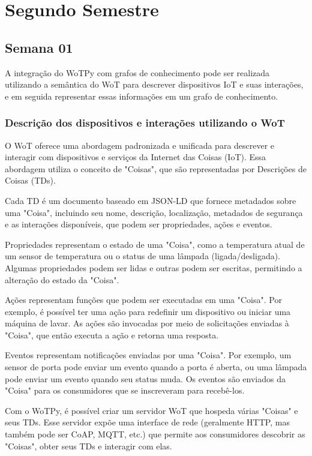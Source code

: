 \chapter{Segundo Semestre}


\section{Semana 01}

A integração do WoTPy com grafos de conhecimento pode ser realizada utilizando a semântica do WoT para descrever dispositivos IoT e suas interações, e em seguida representar essas informações em um grafo de conhecimento.

\subsection{Descrição dos dispositivos e interações utilizando o WoT}

O WoT oferece uma abordagem padronizada e unificada para descrever e interagir com dispositivos e serviços da Internet das Coisas (IoT). Essa abordagem utiliza o conceito de "Coisas", que são representadas por Descrições de Coisas (TDs).

Cada TD é um documento baseado em JSON-LD que fornece metadados sobre uma "Coisa", incluindo seu nome, descrição, localização, metadados de segurança e as interações disponíveis, que podem ser propriedades, ações e eventos.

Propriedades representam o estado de uma "Coisa", como a temperatura atual de um sensor de temperatura ou o status de uma lâmpada (ligada/desligada). Algumas propriedades podem ser lidas e outras podem ser escritas, permitindo a alteração do estado da "Coisa".

Ações representam funções que podem ser executadas em uma "Coisa". Por exemplo, é possível ter uma ação para redefinir um dispositivo ou iniciar uma máquina de lavar. As ações são invocadas por meio de solicitações enviadas à "Coisa", que então executa a ação e retorna uma resposta.

Eventos representam notificações enviadas por uma "Coisa". Por exemplo, um sensor de porta pode enviar um evento quando a porta é aberta, ou uma lâmpada pode enviar um evento quando seu status muda. Os eventos são enviados da "Coisa" para os consumidores que se inscreveram para recebê-los.

Com o WoTPy, é possível criar um servidor WoT que hospeda várias "Coisas" e seus TDs. Esse servidor expõe uma interface de rede (geralmente HTTP, mas também pode ser CoAP, MQTT, etc.) que permite aos consumidores descobrir as "Coisas", obter seus TDs e interagir com elas.

